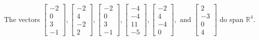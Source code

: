 \begin{exercise}
\begin{exerciseStatement}
  \end{exerciseStatement}
  \begin{exerciseAnswer}
   The vectors \(\left[\begin{array}{r}
-2 \\
0 \\
3 \\
-1
\end{array}\right] , \left[\begin{array}{r}
-2 \\
4 \\
-2 \\
2
\end{array}\right] , \left[\begin{array}{r}
-2 \\
0 \\
3 \\
-1
\end{array}\right] , \left[\begin{array}{r}
-4 \\
-4 \\
11 \\
-5
\end{array}\right] , \left[\begin{array}{r}
-2 \\
4 \\
-4 \\
0
\end{array}\right] , \text{ and } \left[\begin{array}{r}
2 \\
-3 \\
0 \\
4
\end{array}\right]\) 
  	 do  
	span \(\mathbb{R}^4\).
  


  \end{exerciseAnswer}
\end{exercise}